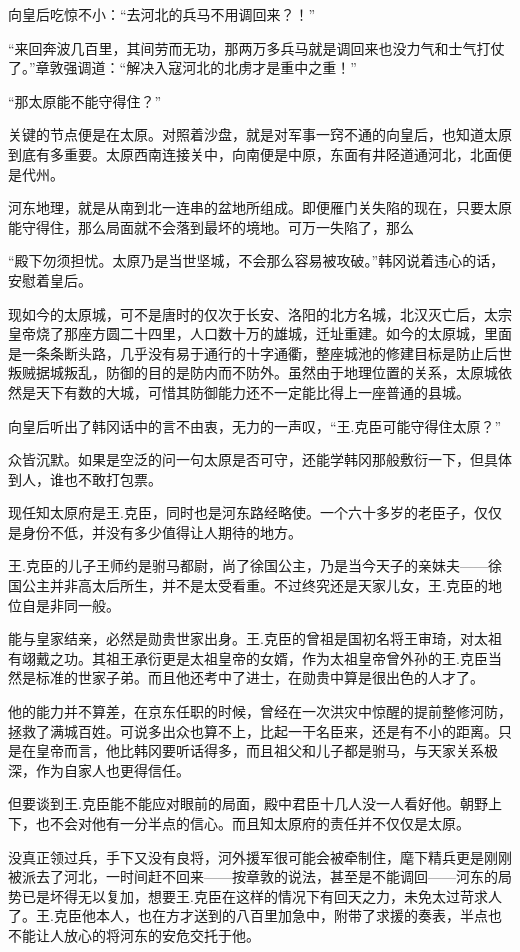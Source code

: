 向皇后吃惊不小：“去河北的兵马不用调回来？！”

“来回奔波几百里，其间劳而无功，那两万多兵马就是调回来也没力气和士气打仗了。”章敦强调道：“解决入寇河北的北虏才是重中之重！”

“那太原能不能守得住？”

关键的节点便是在太原。对照着沙盘，就是对军事一窍不通的向皇后，也知道太原到底有多重要。太原西南连接关中，向南便是中原，东面有井陉道通河北，北面便是代州。

河东地理，就是从南到北一连串的盆地所组成。即便雁门关失陷的现在，只要太原能守得住，那么局面就不会落到最坏的境地。可万一失陷了，那么

“殿下勿须担忧。太原乃是当世坚城，不会那么容易被攻破。”韩冈说着违心的话，安慰着皇后。

现如今的太原城，可不是唐时的仅次于长安、洛阳的北方名城，北汉灭亡后，太宗皇帝烧了那座方圆二十四里，人口数十万的雄城，迁址重建。如今的太原城，里面是一条条断头路，几乎没有易于通行的十字通衢，整座城池的修建目标是防止后世叛贼据城叛乱，防御的目的是防内而不防外。虽然由于地理位置的关系，太原城依然是天下有数的大城，可惜其防御能力还不一定能比得上一座普通的县城。

向皇后听出了韩冈话中的言不由衷，无力的一声叹，“王.克臣可能守得住太原？”

众皆沉默。如果是空泛的问一句太原是否可守，还能学韩冈那般敷衍一下，但具体到人，谁也不敢打包票。

现任知太原府是王.克臣，同时也是河东路经略使。一个六十多岁的老臣子，仅仅是身份不低，并没有多少值得让人期待的地方。

王.克臣的儿子王师约是驸马都尉，尚了徐国公主，乃是当今天子的亲妹夫——徐国公主并非高太后所生，并不是太受看重。不过终究还是天家儿女，王.克臣的地位自是非同一般。

能与皇家结亲，必然是勋贵世家出身。王.克臣的曾祖是国初名将王审琦，对太祖有翊戴之功。其祖王承衍更是太祖皇帝的女婿，作为太祖皇帝曾外孙的王.克臣当然是标准的世家子弟。而且他还考中了进士，在勋贵中算是很出色的人才了。

他的能力并不算差，在京东任职的时候，曾经在一次洪灾中惊醒的提前整修河防，拯救了满城百姓。可说多出众也算不上，比起一干名臣来，还是有不小的距离。只是在皇帝而言，他比韩冈要听话得多，而且祖父和儿子都是驸马，与天家关系极深，作为自家人也更得信任。

但要谈到王.克臣能不能应对眼前的局面，殿中君臣十几人没一人看好他。朝野上下，也不会对他有一分半点的信心。而且知太原府的责任并不仅仅是太原。

没真正领过兵，手下又没有良将，河外援军很可能会被牵制住，麾下精兵更是刚刚被派去了河北，一时间赶不回来——按章敦的说法，甚至是不能调回——河东的局势已是坏得无以复加，想要王.克臣在这样的情况下有回天之力，未免太过苛求人了。王.克臣他本人，也在方才送到的八百里加急中，附带了求援的奏表，半点也不能让人放心的将河东的安危交托于他。

